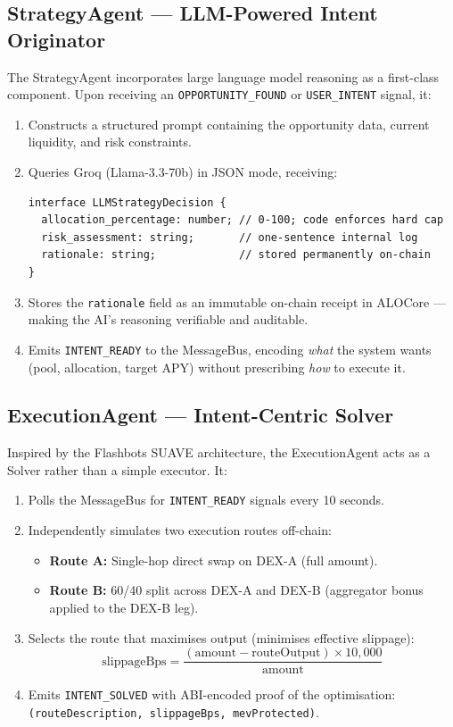\documentclass[11pt,a4paper]{article}
\begin{document}
\subsection{StrategyAgent --- LLM-Powered Intent Originator}

The StrategyAgent incorporates large language model reasoning as a first-class component.
Upon receiving an \texttt{OPPORTUNITY\_FOUND} or \texttt{USER\_INTENT} signal, it:

\begin{enumerate}[leftmargin=1.8em]
  \item Constructs a structured prompt containing the opportunity data, current liquidity, and
        risk constraints.
  \item Queries Groq (Llama-3.3-70b) in JSON mode, receiving:
\begin{lstlisting}[caption=LLM Strategy Decision Schema]
interface LLMStrategyDecision {
  allocation_percentage: number; // 0-100; code enforces hard cap
  risk_assessment: string;       // one-sentence internal log
  rationale: string;             // stored permanently on-chain
}
\end{lstlisting}
  \item Stores the \texttt{rationale} field as an immutable on-chain receipt in ALOCore ---
        making the AI's reasoning verifiable and auditable.
  \item Emits \texttt{INTENT\_READY} to the MessageBus, encoding \emph{what} the system
        wants (pool, allocation, target APY) without prescribing \emph{how} to execute it.
\end{enumerate}

\subsection{ExecutionAgent --- Intent-Centric Solver}

Inspired by the Flashbots SUAVE architecture, the ExecutionAgent acts as a Solver rather than
a simple executor. It:

\begin{enumerate}[leftmargin=1.8em]
  \item Polls the MessageBus for \texttt{INTENT\_READY} signals every 10 seconds.
  \item Independently simulates two execution routes off-chain:
    \begin{itemize}
      \item \textbf{Route A:} Single-hop direct swap on DEX-A (full amount).
      \item \textbf{Route B:} 60/40 split across DEX-A and DEX-B (aggregator bonus applied
            to the DEX-B leg).
    \end{itemize}
  \item Selects the route that maximises output (minimises effective slippage):
    \[
      \text{slippageBps} = \frac{(\text{amount} - \text{routeOutput}) \times 10{,}000}{\text{amount}}
    \]
  \item Emits \texttt{INTENT\_SOLVED} with ABI-encoded proof of the optimisation:
        \texttt{(routeDescription, slippageBps, mevProtected)}.
\end{enumerate}
\end{document}
